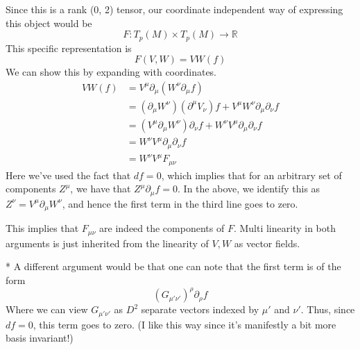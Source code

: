 Since this is a rank (0, 2) tensor, our coordinate independent way of expressing this object would be 
\[ 
F: T_p( M ) \times T_p ( M ) \rightarrow \mathbb{R}
\] 
This specific representation is 
\[ 
F(V, W) = VW(f) 
\] 
We can show this by expanding with coordinates. 
\begin{align*} 
VW(f)  &= V^\mu \partial_\mu ( W^\nu \partial_\mu f ) \\
&= (\partial_\mu W^\nu)( \partial^\mu V_\nu )f + V^\mu W^\nu \partial_\mu \partial_\nu f \\
&= (V^\mu \partial_\mu W^\nu) \partial_\nu f + W^\nu V^\mu \partial_\mu \partial_\nu f \\
&= W^\nu V^\mu \partial_\mu \partial_\nu f \\
&= W^\nu V^\mu F_{\mu \nu}
\end{align*} Here we've used the fact that $df=0$, which implies that for an arbitrary set of components $Z^\mu$, we have that $Z^\mu \partial_\mu f = 0 $. In the above, we identify this as $Z^\nu = V^\mu \partial_\mu W^\nu$, and hence the first term in the third line goes to zero.  

This implies that $F_{\mu \nu}$ are indeed the components of $F$. Multi linearity in both arguments is just inherited 
from the linearity of $ V , W $ as vector fields. 

* 
A different argument would be that one can note that the first term is of the form 
\[
( G_{ \mu' \nu' })^\rho \partial _\rho f  
\] Where we can view $ G_{\mu' \nu' } $ as $D ^ 2 $ separate vectors indexed by $ \mu' $ and $ \nu' $. 
Thus, since  $df = 0 $, this term goes to zero. (I like this way since it's manifestly 
a bit more basis invariant!) 

\pagebreak

